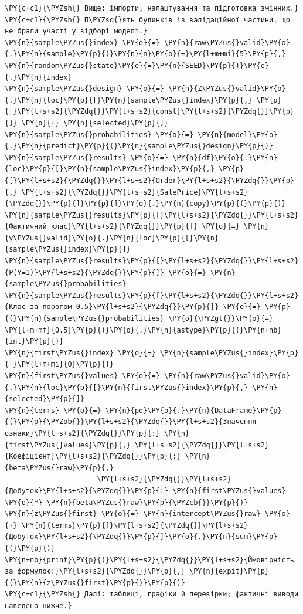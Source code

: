 \begin{Verbatim}[commandchars=\\\{\}]
\PY{c+c1}{\PYZsh{} Вище: імпорти, налаштування та підготовка змінних.}
\PY{c+c1}{\PYZsh{} П\PYZsq{}ять будинків із валідаційної частини, що не брали участі у відборі моделі.}
\PY{n}{sample\PYZus{}index} \PY{o}{=} \PY{n}{raw\PYZus{}valid}\PY{o}{.}\PY{n}{sample}\PY{p}{(}\PY{n}{n}\PY{o}{=}\PY{l+m+mi}{5}\PY{p}{,} \PY{n}{random\PYZus{}state}\PY{o}{=}\PY{n}{SEED}\PY{p}{)}\PY{o}{.}\PY{n}{index}
\PY{n}{sample\PYZus{}design} \PY{o}{=} \PY{n}{Z\PYZus{}valid}\PY{o}{.}\PY{n}{loc}\PY{p}{[}\PY{n}{sample\PYZus{}index}\PY{p}{,} \PY{p}{[}\PY{l+s+s2}{\PYZdq{}}\PY{l+s+s2}{const}\PY{l+s+s2}{\PYZdq{}}\PY{p}{]} \PY{o}{+} \PY{n}{selected}\PY{p}{]}
\PY{n}{sample\PYZus{}probabilities} \PY{o}{=} \PY{n}{model}\PY{o}{.}\PY{n}{predict}\PY{p}{(}\PY{n}{sample\PYZus{}design}\PY{p}{)}
\PY{n}{sample\PYZus{}results} \PY{o}{=} \PY{n}{df}\PY{o}{.}\PY{n}{loc}\PY{p}{[}\PY{n}{sample\PYZus{}index}\PY{p}{,} \PY{p}{[}\PY{l+s+s2}{\PYZdq{}}\PY{l+s+s2}{Order}\PY{l+s+s2}{\PYZdq{}}\PY{p}{,} \PY{l+s+s2}{\PYZdq{}}\PY{l+s+s2}{SalePrice}\PY{l+s+s2}{\PYZdq{}}\PY{p}{]}\PY{p}{]}\PY{o}{.}\PY{n}{copy}\PY{p}{(}\PY{p}{)}
\PY{n}{sample\PYZus{}results}\PY{p}{[}\PY{l+s+s2}{\PYZdq{}}\PY{l+s+s2}{Фактичний клас}\PY{l+s+s2}{\PYZdq{}}\PY{p}{]} \PY{o}{=} \PY{n}{y\PYZus{}valid}\PY{o}{.}\PY{n}{loc}\PY{p}{[}\PY{n}{sample\PYZus{}index}\PY{p}{]}
\PY{n}{sample\PYZus{}results}\PY{p}{[}\PY{l+s+s2}{\PYZdq{}}\PY{l+s+s2}{P(Y=1)}\PY{l+s+s2}{\PYZdq{}}\PY{p}{]} \PY{o}{=} \PY{n}{sample\PYZus{}probabilities}
\PY{n}{sample\PYZus{}results}\PY{p}{[}\PY{l+s+s2}{\PYZdq{}}\PY{l+s+s2}{Клас за порогом 0.5}\PY{l+s+s2}{\PYZdq{}}\PY{p}{]} \PY{o}{=} \PY{p}{(}\PY{n}{sample\PYZus{}probabilities} \PY{o}{\PYZgt{}}\PY{o}{=} \PY{l+m+mf}{0.5}\PY{p}{)}\PY{o}{.}\PY{n}{astype}\PY{p}{(}\PY{n+nb}{int}\PY{p}{)}
\PY{n}{first\PYZus{}index} \PY{o}{=} \PY{n}{sample\PYZus{}index}\PY{p}{[}\PY{l+m+mi}{0}\PY{p}{]}
\PY{n}{first\PYZus{}values} \PY{o}{=} \PY{n}{raw\PYZus{}valid}\PY{o}{.}\PY{n}{loc}\PY{p}{[}\PY{n}{first\PYZus{}index}\PY{p}{,} \PY{n}{selected}\PY{p}{]}
\PY{n}{terms} \PY{o}{=} \PY{n}{pd}\PY{o}{.}\PY{n}{DataFrame}\PY{p}{(}\PY{p}{\PYZob{}}\PY{l+s+s2}{\PYZdq{}}\PY{l+s+s2}{Значення ознаки}\PY{l+s+s2}{\PYZdq{}}\PY{p}{:} \PY{n}{first\PYZus{}values}\PY{p}{,} \PY{l+s+s2}{\PYZdq{}}\PY{l+s+s2}{Коефіцієнт}\PY{l+s+s2}{\PYZdq{}}\PY{p}{:} \PY{n}{beta\PYZus{}raw}\PY{p}{,}
                      \PY{l+s+s2}{\PYZdq{}}\PY{l+s+s2}{Добуток}\PY{l+s+s2}{\PYZdq{}}\PY{p}{:} \PY{n}{first\PYZus{}values} \PY{o}{*} \PY{n}{beta\PYZus{}raw}\PY{p}{\PYZcb{}}\PY{p}{)}
\PY{n}{z\PYZus{}first} \PY{o}{=} \PY{n}{intercept\PYZus{}raw} \PY{o}{+} \PY{n}{terms}\PY{p}{[}\PY{l+s+s2}{\PYZdq{}}\PY{l+s+s2}{Добуток}\PY{l+s+s2}{\PYZdq{}}\PY{p}{]}\PY{o}{.}\PY{n}{sum}\PY{p}{(}\PY{p}{)}
\PY{n+nb}{print}\PY{p}{(}\PY{l+s+s2}{\PYZdq{}}\PY{l+s+s2}{Ймовірність за формулою:}\PY{l+s+s2}{\PYZdq{}}\PY{p}{,} \PY{n}{expit}\PY{p}{(}\PY{n}{z\PYZus{}first}\PY{p}{)}\PY{p}{)}
\PY{c+c1}{\PYZsh{} Далі: таблиці, графіки й перевірки; фактичні виводи наведено нижче.}
\end{Verbatim}
